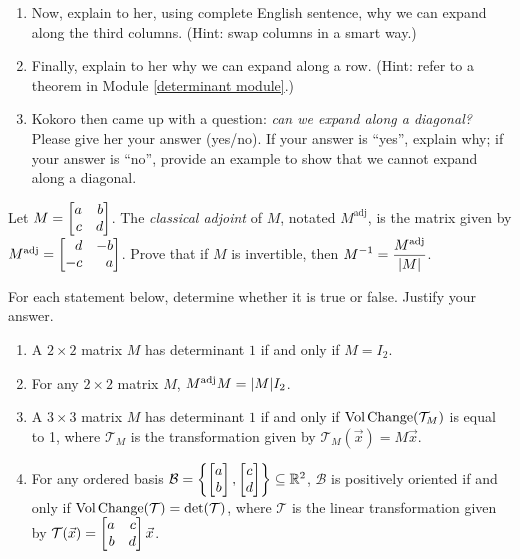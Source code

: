 \begin{exercises}
\begin{problist}
\begin{enumerate}
			\item Now, explain to her, using complete English sentence, why we
				can expand along the third columns. (Hint: swap columns in a smart
				way.)

			\item Finally, explain to her why we can expand along a row. (Hint: refer
				to a theorem in Module \ref{determinant module}.)
            
            \item Kokoro then came up with a question: \emph{can we expand along a diagonal?} 
            Please give her your answer (yes/no). If your answer is ``yes'', explain why; if your
            answer is ``no'', provide an example to show that we cannot expand along a diagonal. 
		\end{enumerate}
        \prob Let $M=\mat{a & b \\ c & d}$. The \emph{classical adjoint} of $M$, notated
        $M^{\text{adj}}$, is the matrix given by $M^{\text{adj}}=\mat{d & -b \\ -c & a}$. Prove that if $M$ is invertible, then $\displaystyle M^{-1}=\frac{M^{\text{adj}}}{\lvert M\rvert}$.
		
		\prob For each statement below, determine whether it is true or
           false. Justify your answer.
         \begin{enumerate}
           \item A $2\times 2$ matrix $M$ has determinant $1$ if and only if $M=I_2$.
           \item For any $2\times 2$ matrix $M$, $M^{\text{adj}}M=\lvert M\rvert I_2$.
           \item A $3\times 3$ matrix $M$ has determinant $1$ if and only if $\operatorname{Vol\hspace{1.5pt}Change}(\mathcal{T}_{M})$ is equal to 1, where $\mathcal{T}_M$ is the transformation given by $\mathcal{T}_M(\vec x)=M\vec x$.
           \item For any ordered basis $\mathcal{B}=\left\{\begin{bmatrix}a \\ b\end{bmatrix},\begin{bmatrix}c \\ d\end{bmatrix}\right\}\subseteq \mathbb{R}^2$,
           $\mathcal{B}$ is positively oriented if and only if $\operatorname{Vol\hspace{1.5pt}Change}(\mathcal{T})=\det(\mathcal{T})$, where $\mathcal{T}$ is the linear transformation given by $\mathcal{T}(\vec x)=\mat{a & c \\ b & d}\vec x$.
         \end{enumerate}
	\end{problist}
\end{exercises} 